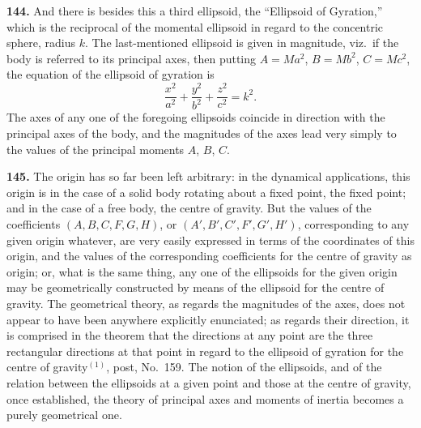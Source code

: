 \documentclass[11pt,a4paper]{article}
\theoremstyle{definition}
\begin{document}
\textbf{144.} And there is besides this a third ellipsoid, the ``Ellipsoid of Gyration,'' which is the reciprocal of the momental ellipsoid in regard to the concentric sphere, radius $k$. The last-mentioned ellipsoid is given in magnitude, viz.\ if the body is referred to its principal axes, then putting $A = Ma^2$, $B = Mb^2$, $C = Mc^2$, the equation of the ellipsoid of gyration is
\[
\frac{x^2}{a^2} + \frac{y^2}{b^2} + \frac{z^2}{c^2} = k^2.
\]
The axes of any one of the foregoing ellipsoids coincide in direction with the principal axes of the body, and the magnitudes of the axes lead very simply to the values of the principal moments $A$, $B$, $C$.

\textbf{145.} The origin has so far been left arbitrary: in the dynamical applications, this origin is in the case of a solid body rotating about a fixed point, the fixed point; and in the case of a free body, the centre of gravity. But the values of the coefficients $(A, B, C, F, G, H)$, or $(A', B', C', F', G', H')$, corresponding to any given origin whatever, are very easily expressed in terms of the coordinates of this origin, and the values of the corresponding coefficients for the centre of gravity as origin; or, what is the same thing, any one of the ellipsoids for the given origin may be geometrically constructed by means of the ellipsoid for the centre of gravity. The geometrical theory, as regards the magnitudes of the axes, does not appear to have been anywhere explicitly enunciated; as regards their direction, it is comprised in the theorem that the directions at any point are the three rectangular directions at that point in regard to the ellipsoid of gyration for the centre of gravity$^{(1)}$, post, No.~159. The notion of the ellipsoids, and of the relation between the ellipsoids at a given point and those at the centre of gravity, once established, the theory of principal axes and moments of inertia becomes a purely geometrical one.

\end{document}
